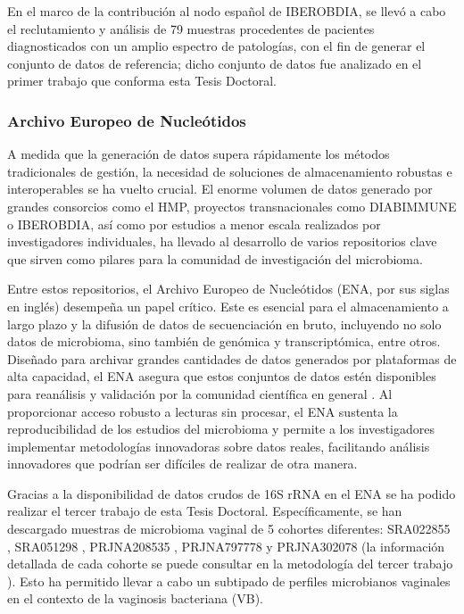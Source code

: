 En el marco de la contribución al nodo español de IBEROBDIA, se llevó a cabo el reclutamiento y análisis de 79 muestras procedentes de pacientes diagnosticados con un amplio espectro de patologías, con el fin de generar el conjunto de datos de referencia; dicho conjunto de datos fue analizado en el primer trabajo \cite{paper1} que conforma esta Tesis Doctoral.

\subsubsection{Archivo Europeo de Nucleótidos}

A medida que la generación de datos supera rápidamente los métodos tradicionales de gestión, la necesidad de soluciones de almacenamiento robustas e interoperables se ha vuelto crucial. El enorme volumen de datos generado por grandes consorcios como el HMP, proyectos transnacionales como DIABIMMUNE o IBEROBDIA, así como por estudios a menor escala realizados por investigadores individuales, ha llevado al desarrollo de varios repositorios clave que sirven como pilares para la comunidad de investigación del microbioma.

Entre estos repositorios, el Archivo Europeo de Nucleótidos (ENA, por sus siglas en inglés) desempeña un papel crítico. Este es esencial para el almacenamiento a largo plazo y la difusión de datos de secuenciación en bruto, incluyendo no solo datos de microbioma, sino también de genómica y transcriptómica, entre otros. Diseñado para archivar grandes cantidades de datos generados por plataformas de alta capacidad, el ENA asegura que estos conjuntos de datos estén disponibles para reanálisis y validación por la comunidad científica en general \cite{leinonen2010european}. Al proporcionar acceso robusto a lecturas sin procesar, el ENA sustenta la reproducibilidad de los estudios del microbioma y permite a los investigadores implementar metodologías innovadoras sobre datos reales, facilitando análisis innovadores que podrían ser difíciles de realizar de otra manera.

Gracias a la disponibilidad de datos crudos de 16S rRNA en el ENA se ha podido realizar el tercer trabajo \cite{paper3} de esta Tesis Doctoral. Específicamente, se han descargado muestras de microbioma vaginal de 5 cohortes diferentes: SRA022855 \cite{ravel2011vaginal}, SRA051298 \cite{srinivasan2012bacterial}, PRJNA208535 \cite{ravel2013daily}, PRJNA797778 \cite{france2022insight} y PRJNA302078 \cite{xiao2016predictive} (la información detallada de cada cohorte se puede consultar en la metodología del tercer trabajo \cite{paper3}). Esto ha permitido llevar a cabo un subtipado de perfiles microbianos vaginales en el contexto de la vaginosis bacteriana (VB).


